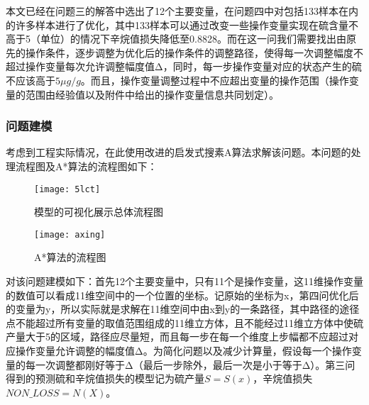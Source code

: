 \documentclass[bwprint]{gmcmthesis}
\begin{document}
本文已经在问题三的解答中选出了12个主要变量，在问题四中对包括133样本在内的许多样本进行了优化，其中133样本可以通过改变一些操作变量实现在硫含量不高于5（单位）的情况下辛烷值损失降低至0.8828。而在这一问我们需要找出由原先的操作条件，逐步调整为优化后的操作条件的调整路径，使得每一次调整幅度不超过操作变量每次允许调整幅度值Δ，同时，每一步操作变量对应的状态产生的硫不应该高于$5μg/g$。而且，操作变量调整过程中不应超出变量的操作范围（操作变量的范围由经验值以及附件中给出的操作变量信息共同划定）。

\FloatBarrier
\subsubsection{问题建模}
考虑到工程实际情况，在此使用改进的启发式搜素A\*算法求解该问题。本问题的处理流程图及A*算法的流程图如下：
\begin{figure}[H]
	\centering
	\texttt{[image: 5lct]}
	\caption{模型的可视化展示总体流程图}
\end{figure}

\begin{figure}[H]
	\centering
	\texttt{[image: axing]}
	\caption{A*算法的流程图}
\end{figure}
对该问题建模如下：首先12个主要变量中，只有11个是操作变量，这11维操作变量的数值可以看成11维空间中的一个位置的坐标。记原始的坐标为x，第四问优化后的变量为y，所以实际就是求解在11维空间中由x到y的一条路径，其中路径的途径点不能超过所有变量的取值范围组成的11维立方体，且不能经过11维立方体中使硫产量大于5的区域，路径应尽量短，而且每一步在每一个维度上步幅都不应超过对应操作变量允许调整的幅度值Δ。为简化问题以及减少计算量，假设每一个操作变量的每一次调整都刚好等于Δ（最后一步除外，最后一次是小于等于Δ）。第三问得到的预测硫和辛烷值损失的模型记为硫产量$S=S(x)$，辛烷值损失$NON\_LOSS=N(X)$。


\FloatBarrier
\end{document}
